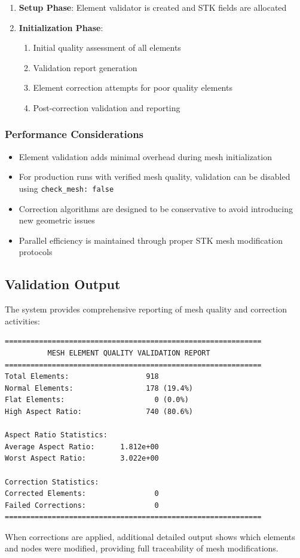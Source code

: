 \documentclass[12pt]{extarticle}
\newcommand{\<}{\langle}
\renewcommand{\>}{\rangle}
\theoremstyle{definition}
\begin{document}
\begin{enumerate}
    \item \textbf{Setup Phase}: Element validator is created and STK fields are allocated
    \item \textbf{Initialization Phase}: 
    \begin{enumerate}
        \item Initial quality assessment of all elements
        \item Validation report generation
        \item Element correction attempts for poor quality elements
        \item Post-correction validation and reporting
    \end{enumerate}
\end{enumerate}

\subsubsection{Performance Considerations}

\begin{itemize}
    \item Element validation adds minimal overhead during mesh initialization
    \item For production runs with verified mesh quality, validation can be disabled using \texttt{check\_mesh: false}
    \item Correction algorithms are designed to be conservative to avoid introducing new geometric issues
    \item Parallel efficiency is maintained through proper STK mesh modification protocols
\end{itemize}

\subsection{Validation Output}

The system provides comprehensive reporting of mesh quality and correction activities:

\begin{verbatim}
============================================================
          MESH ELEMENT QUALITY VALIDATION REPORT
============================================================
Total Elements:                  918
Normal Elements:                 178 (19.4%)
Flat Elements:                     0 (0.0%)
High Aspect Ratio:               740 (80.6%)

Aspect Ratio Statistics:
Average Aspect Ratio:      1.812e+00
Worst Aspect Ratio:        3.022e+00

Correction Statistics:
Corrected Elements:                0
Failed Corrections:                0
============================================================
\end{verbatim}

When corrections are applied, additional detailed output shows which elements and nodes were modified, providing full traceability of mesh modifications.



\end{document}
